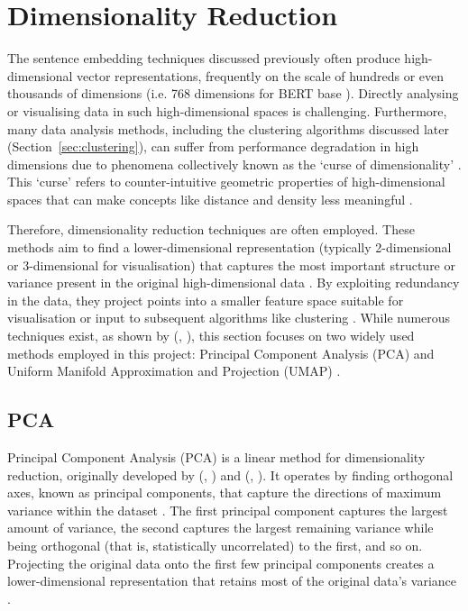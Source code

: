 \documentclass[10pt,oneside]{report}
\renewcommand{\citet}[1]{\citeauthor{#1}, \citeyear{#1}}
\begin{document}
\section{Dimensionality Reduction}\label{sec:dimred}

The sentence embedding techniques discussed previously often produce high-dimensional vector representations, frequently on the scale of hundreds or even thousands of dimensions (i.e. 768 dimensions for BERT base \cite{devlin2019bert}). Directly analysing or visualising data in such high-dimensional spaces is challenging. Furthermore, many data analysis methods, including the clustering algorithms discussed later (Section~\ref{sec:clustering}), can suffer from performance degradation in high dimensions due to phenomena collectively known as the `curse of dimensionality' \cite{verleysen2005curse, hinneburg1999optimal}. This `curse' refers to counter-intuitive geometric properties of high-dimensional spaces that can make concepts like distance and density less meaningful \cite{verleysen2005curse}.

Therefore, dimensionality reduction techniques are often employed. These methods aim to find a lower-dimensional representation (typically 2-dimensional or 3-dimensional for visualisation) that captures the most important structure or variance present in the original high-dimensional data \cite{sorzano2014survey}. By exploiting redundancy in the data, they project points into a smaller feature space suitable for visualisation or input to subsequent algorithms like clustering \cite{sorzano2014survey, hinneburg1999optimal}. While numerous techniques exist, as shown by (\citet{sorzano2014survey}), this section focuses on two widely used methods employed in this project: Principal Component Analysis (PCA) \cite{pearson1901liii, hotelling1933analysis} and Uniform Manifold Approximation and Projection (UMAP) \cite{mcinnes2018umap}.

\subsection{PCA}\label{sec:pca}

Principal Component Analysis (PCA) is a linear method for dimensionality reduction, originally developed by (\citet{pearson1901liii}) and (\citet{hotelling1933analysis}). It operates by finding orthogonal axes, known as principal components, that capture the directions of maximum variance within the dataset \cite{abdi2010principal}. The first principal component captures the largest amount of variance, the second captures the largest remaining variance while being orthogonal (that is, statistically uncorrelated) to the first, and so on. Projecting the original data onto the first few principal components creates a lower-dimensional representation that retains most of the original data's variance \cite{abdi2010principal}.
\end{document}
